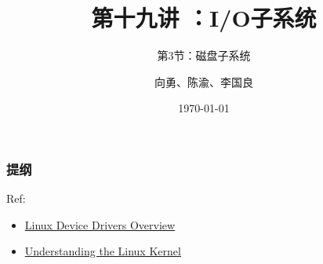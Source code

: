 


\title[第19讲]{第十九讲 ：I/O子系统} %
\subtitle{第3节：磁盘子系统}
\author{向勇、陈渝、李国良} %
\date{\today} %



\begin{frame}
\titlepage %
\end{frame}

\begin{frame}
\frametitle{提纲} %
\tableofcontents %

Ref:
    \begin{itemize}
        \item \href{http://osq.cs.berkeley.edu/public/JFoster-Drivers.ppt}{Linux Device Drivers Overview}
        \item \href{http://ermak.cs.nstu.ru/understanding.linux.kernel.pdf}{Understanding the Linux Kernel}
    \end{itemize}

\end{frame}
